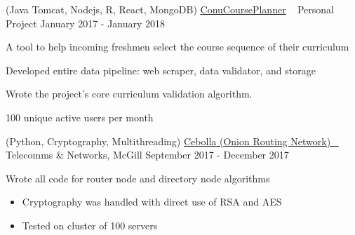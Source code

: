 \begin{cventries}

\cventry
{(Java Tomcat, Nodejs, R, React, MongoDB)} %
{\href{http://conucourseplanner.online}{ConuCoursePlanner} \ \href{http://conucourseplanner.online/}{\faLink} \href{https://github.com/stumash/CoursePlanner}{\faGithubSquare\acvHeaderIconSep}} %
{Personal Project} %
{January 2017 - January 2018} %
{ %
\begin{cvitems}
\item {A tool to help incoming freshmen select the course sequence of their curriculum}
\item {Developed entire data pipeline: web scraper, data validator, and storage}
\item {Wrote the project's core curriculum validation algorithm.}
\item {100 unique active users per month}
\end{cvitems}
}


\cventry
{(Python, Cryptography, Multithreading)} %
{\href{https://github.com/CamiloGarciaLaRotta/Cebolla}{Cebolla (Onion Routing Network) \ \faGithubSquare\acvHeaderIconSep} \href{https://www.youtube.com/watch?v=jR9N_xxLs6A}{\faYoutubePlay}} %
{Telecomms \& Networks, McGill} %
{September 2017 - December 2017} %
{ %
\begin{cvitems}
\item {Wrote all code for router node and directory node algorithms}
    \begin{itemize}
        \item {Cryptography was handled with direct use of RSA and AES}
        \item {Tested on cluster of 100 servers}
    \end{itemize}
\end{cvitems}
}


\end{cventries}
